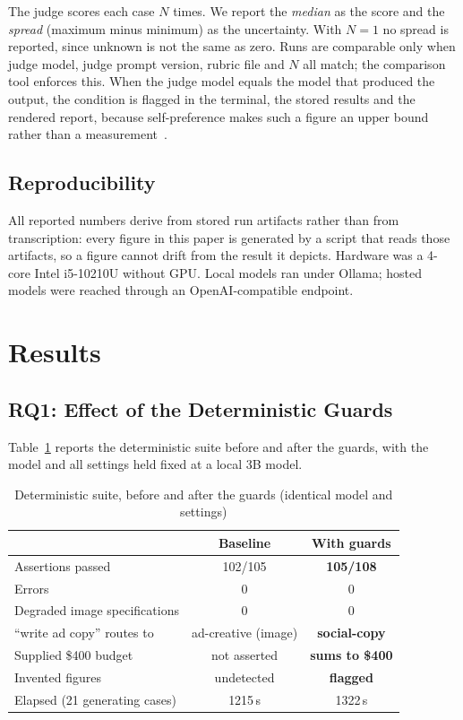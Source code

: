 \documentclass[journal]{IEEEtran}
\begin{document}
The judge scores each case $N$ times. We report the \emph{median} as the score
and the \emph{spread} (maximum minus minimum) as the uncertainty. With $N=1$ no
spread is reported, since unknown is not the same as zero. Runs are comparable
only when judge model, judge prompt version, rubric file and $N$ all match; the
comparison tool enforces this. When the judge model equals the model that
produced the output, the condition is flagged in the terminal, the stored
results and the rendered report, because self-preference makes such a figure an
upper bound rather than a measurement~\cite{panickssery2024selfpref}.

\subsection{Reproducibility}
All reported numbers derive from stored run artifacts rather than from
transcription: every figure in this paper is generated by a script that reads
those artifacts, so a figure cannot drift from the result it depicts. Hardware
was a 4-core Intel i5-10210U without GPU. Local models ran under Ollama;
hosted models were reached through an OpenAI-compatible endpoint.

\section{Results}

\subsection{RQ1: Effect of the Deterministic Guards}
\label{sec:rq1}
Table~\ref{tab:rq1} reports the deterministic suite before and after the
guards, with the model and all settings held fixed at a local 3B model.

\begin{table}[!t]
\caption{Deterministic suite, before and after the guards (identical model and settings)}
\label{tab:rq1}
\centering
\footnotesize
\begin{tabular}{@{}lcc@{}}
\toprule
 & Baseline & With guards\\
\midrule
Assertions passed            & 102/105 & \textbf{105/108}\\
Errors                       & 0 & 0\\
Degraded image specifications& 0 & 0\\
``write ad copy'' routes to  & ad-creative (image) & \textbf{social-copy}\\
Supplied \$400 budget        & not asserted & \textbf{sums to \$400}\\
Invented figures             & undetected & \textbf{flagged}\\
Elapsed (21 generating cases)& 1215\,s & 1322\,s\\
\bottomrule
\end{tabular}
\end{table}
\end{document}

